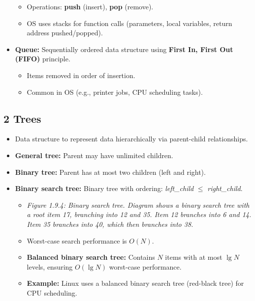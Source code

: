 \documentclass{article}
\begin{document}
\begin{itemize}
\begin{itemize}
        \item Operations: \textbf{push} (insert), \textbf{pop} (remove).
        \item OS uses stacks for function calls (parameters, local variables, return address pushed/popped).
    \end{itemize}
    \item \textbf{Queue:} Sequentially ordered data structure using \textbf{First In, First Out (FIFO)} principle.
    \begin{itemize}
        \item Items removed in order of insertion.
        \item Common in OS (e.g., printer jobs, CPU scheduling tasks).
    \end{itemize}
\end{itemize}

\subsection*{2 Trees}
\begin{itemize}
    \item Data structure to represent data hierarchically via parent-child relationships.
    \item \textbf{General tree:} Parent may have unlimited children.
    \item \textbf{Binary tree:} Parent has at most two children (left and right).
    \item \textbf{Binary search tree:} Binary tree with ordering: \textit{left\_child} $\le$ \textit{right\_child}.
    \begin{itemize}
        \item \textit{Figure 1.9.4: Binary search tree. Diagram shows a binary search tree with a root item 17, branching into 12 and 35. Item 12 branches into 6 and 14. Item 35 branches into 40, which then branches into 38.}
        \item Worst-case search performance is $O(N)$.
        \item \textbf{Balanced binary search tree:} Contains $N$ items with at most $\lg N$ levels, ensuring $O(\lg N)$ worst-case performance.
        \item \textbf{Example:} Linux uses a balanced binary search tree (red-black tree) for CPU scheduling.
    \end{itemize}
\end{itemize}
\end{document}
